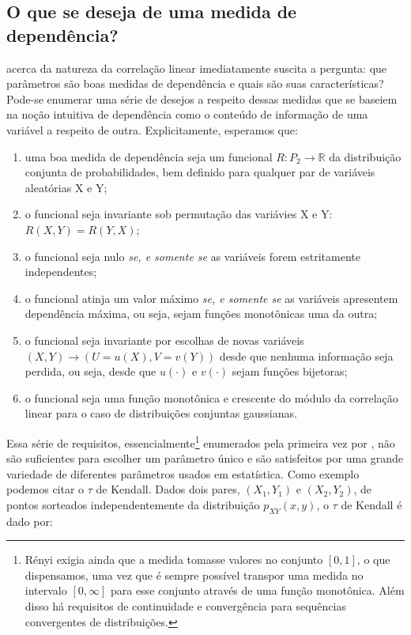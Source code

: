 \subsection{O que se deseja de uma medida de dependência?}

 acerca da natureza da correlação linear imediatamente suscita a pergunta: que parâmetros são boas medidas de dependência e quais são suas características? Pode-se enumerar uma série de desejos a respeito dessas medidas que se baseiem na noção intuitiva de dependência como o conteúdo de informação de uma variável a respeito de outra. Explicitamente, esperamos que:
\begin{enumerate}
\item \label{item:funcional} uma boa medida de dependência seja um funcional $R : P_{2} \to \mathbb{R}$ da distribuição conjunta de probabilidades, bem definido para qualquer par de variáveis aleatórias X e Y; 
\item \label{item:simétrico} o funcional seja invariante sob permutação das variávies X e Y: $R(X,Y) = R(Y,X)$;
\item \label{item:indep} o funcional seja nulo \textit{se, e somente se} as variáveis forem estritamente independentes;
\item \label{item:maximo} o funcional atinja um valor máximo \textit{se, e somente se} as variáveis apresentem dependência máxima, ou seja, sejam funções monotônicas uma da outra;
\item \label{item:invariante} o funcional seja invariante por escolhas de novas variáveis $(X, Y) \rightarrow (U = u(X), V = v(Y))$ desde que nenhuma informação seja perdida, ou seja, desde que  $u(\cdot)$ e $v(\cdot)$ sejam funções bijetoras;
\item \label{item:normal} o funcional seja uma função monotônica e crescente do módulo da correlação linear para o caso de distribuições conjuntas gaussianas.	
\end{enumerate}
Essa série de requisitos, essencialmente\footnote{Rényi exigia ainda que a medida tomasse valores no conjunto $[0,1]$, o que dispensamos, uma vez que é sempre possível transpor uma medida no intervalo $[0,\infty]$ para esse conjunto através de uma função monotônica. Além disso há requisitos de continuidade e convergência para sequências convergentes de distribuições.} enumerados pela primeira vez \cite{Renyi1959, schweizer1981} por \citet{Renyi1959} , não são suficientes para escolher um parâmetro único e são satisfeitos por uma grande variedade de diferentes parâmetros usados em estatística. Como exemplo podemos citar o $\tau$ de Kendall. Dados dois pares, $(X_1, Y_1)$ e $(X_2,Y_2)$, de pontos sorteados independentemente da distribuição $p_{XY}(x,y)$, o $\tau$ de Kendall é dado por:
